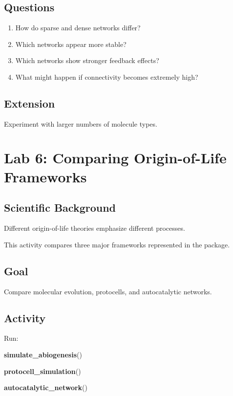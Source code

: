 \documentclass[
  oneside,
  openany]{book}
\newenvironment{Shaded}{\begin{snugshade}}{\end{snugshade}}
\newcommand{\FunctionTok}[1]{\textcolor[rgb]{0.13,0.29,0.53}{\textbf{#1}}}
\newcommand{\NormalTok}[1]{#1}
\providecommand{\tightlist}{%
  \setlength{\itemsep}{0pt}\setlength{\parskip}{0pt}}
\begin{document}
\subsection{Questions}\label{questions-4}

\begin{enumerate}
\def\labelenumi{\arabic{enumi}.}
\tightlist
\item
  How do sparse and dense networks differ?
\item
  Which networks appear more stable?
\item
  Which networks show stronger feedback effects?
\item
  What might happen if connectivity becomes extremely high?
\end{enumerate}

\subsection{Extension}\label{extension-4}

Experiment with larger numbers of molecule types.

\section{Lab 6: Comparing Origin-of-Life Frameworks}\label{lab-6-comparing-origin-of-life-frameworks}

\subsection{Scientific Background}\label{scientific-background-5}

Different origin-of-life theories emphasize different processes.

This activity compares three major frameworks represented in the package.

\subsection{Goal}\label{goal-5}

Compare molecular evolution, protocells, and autocatalytic networks.

\subsection{Activity}\label{activity-5}

Run:

\begin{Shaded}
\begin{Highlighting}[]
\FunctionTok{simulate\_abiogenesis}\NormalTok{()}

\FunctionTok{protocell\_simulation}\NormalTok{()}

\FunctionTok{autocatalytic\_network}\NormalTok{()}
\end{Highlighting}
\end{Shaded}
\end{document}
